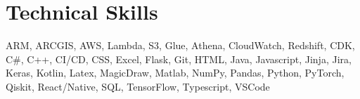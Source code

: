 \documentclass[letterpaper,11pt]{article}
\makeatletter
\newcommand{\resumeItem}[1]{
  \item\small{
    {#1 \vspace{-2pt}}
  }
}
\newcommand{\resumeSubheading}[4]{
  \vspace{-2pt}\item
    \begin{tabular*}{0.97\textwidth}[t]{l@{\extracolsep{\fill}}r}
      \textbf{#1} & #2 \\
      \textit{\small#3} & \textit{\small #4} \\
    \end{tabular*}\vspace{-7pt}
}
\newcommand{\resumeSubHeadingListStart}{\begin{itemize}[leftmargin=0.15in, label={}]}
\newcommand{\resumeSubHeadingListEnd}{\end{itemize}}
\newcommand{\resumeItemListStart}{\begin{itemize}}
\newcommand{\resumeItemListEnd}{\end{itemize}\vspace{-5pt}}
\makeatother
\begin{document}


 

\section{Technical Skills}
 \begin{itemize}[leftmargin=0.1in, label={}]
    \small{\item{
     {ARM, ARCGIS, AWS, Lambda, S3, Glue, Athena, CloudWatch, Redshift, CDK, C\#, C++, CI/CD, CSS, Excel, Flask, Git, HTML, Java, Javascript, Jinja, Jira, Keras, Kotlin, Latex, MagicDraw, Matlab, NumPy, Pandas, Python, PyTorch, Qiskit, React/Native, SQL, TensorFlow, Typescript, VSCode} \\
     }}
 \end{itemize}


\end{document}
